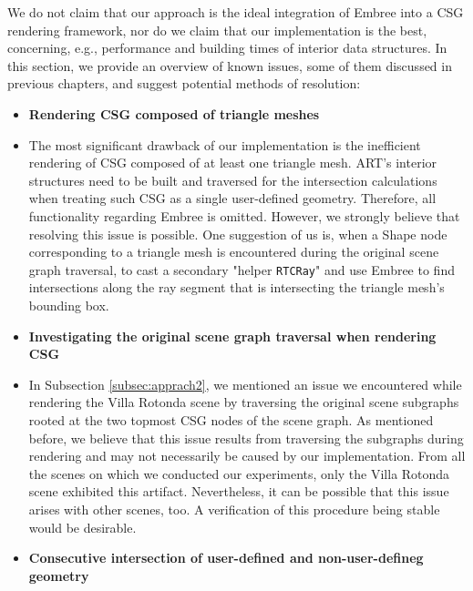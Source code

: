 We do not claim that our approach is the ideal integration of Embree into a CSG rendering framework, nor do we claim that our implementation is the best, concerning, e.g., performance and building times of interior data structures.
In this section, we provide an overview of known issues, some of them discussed in previous chapters, and suggest potential methods of resolution:
\\

\begin{itemize}
	\setlength\itemsep{0.05em}
	
	\item \textbf{Rendering CSG composed of triangle meshes}
	
	\item[] The most significant drawback of our implementation is the inefficient rendering of CSG composed of at least one triangle mesh. ART's interior structures need to be built and traversed for the intersection calculations when treating such CSG as a single user-defined geometry. Therefore, all functionality regarding Embree is omitted. However, we strongly believe that resolving this issue is possible. One suggestion of us is, when a Shape node corresponding to a triangle mesh is encountered during the original scene graph traversal, to cast a secondary "helper \texttt{RTCRay}" and use Embree to find intersections along the ray segment that is intersecting the triangle mesh's bounding box.
	\\
	
	\item \textbf{Investigating the original scene graph traversal when rendering CSG}
	
	\item[] In Subsection \ref{subsec:apprach2}, we mentioned an issue we encountered while rendering the Villa Rotonda scene by traversing the original scene subgraphs rooted at the two topmost CSG nodes of the scene graph. As mentioned before, we believe that this issue results from traversing the subgraphs during rendering and may not necessarily be caused by our implementation. From all the scenes on which we conducted our experiments, only the Villa Rotonda scene exhibited this artifact. Nevertheless, it can be possible that this issue arises with other scenes, too. A verification of this procedure being stable would be desirable.
	\\
	
	\item \textbf{Consecutive intersection of user-defined and non-user-defineg geometry}
	

\end{itemize}
